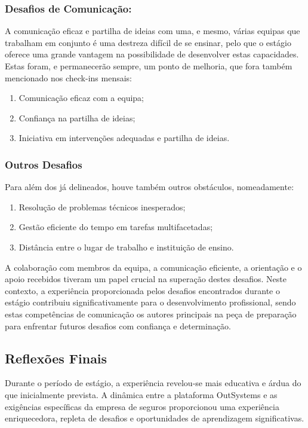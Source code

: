         \subsubsection*{Desafios de Comunicação:}
        A comunicação eficaz e partilha de ideias com uma, e mesmo, várias equipas que trabalham em conjunto é uma destreza difícil de se ensinar, pelo que o estágio oferece uma grande vantagem na possibilidade de desenvolver estas capacidades. Estas foram, e permanecerão sempre, um ponto de melhoria, que fora também mencionado nos check-ins mensais:
        \begin{enumerate}
            \item Comunicação eficaz com a equipa;
            \item Confiança na partilha de ideias;
            \item Iniciativa em intervenções adequadas e partilha de ideias.
        \end{enumerate}

        \subsubsection*{Outros Desafios}
        Para além dos já delineados, houve também outros obstáculos, nomeadamente:
        \begin{enumerate}
            \item Resolução de problemas técnicos inesperados;
            \item Gestão eficiente do tempo em tarefas multifacetadas;
            \item Distância entre o lugar de trabalho e instituição de ensino.
        \end{enumerate}

        A colaboração com membros da equipa, a comunicação eficiente, a orientação e o apoio recebidos tiveram um papel crucial na superação destes desafios. Neste contexto, a experiência proporcionada pelos desafios encontrados durante o estágio contribuiu significativamente para o desenvolvimento profissional, sendo estas competências de comunicação os autores principais na peça de preparação para enfrentar futuros desafios com confiança e determinação. 

    \subsection{Reflexões Finais}\label{sub:conclusoes}

        Durante o período de estágio, a experiência revelou-se mais educativa e árdua do que inicialmente prevista. A dinâmica entre a plataforma OutSystems e as exigências específicas da empresa de seguros proporcionou uma experiência enriquecedora, repleta de desafios e oportunidades de aprendizagem significativas.

